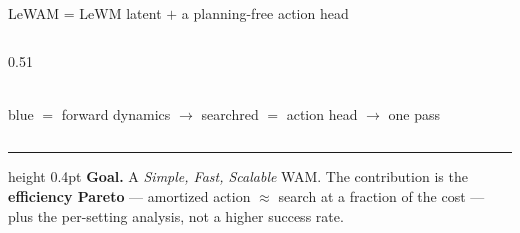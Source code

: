\documentclass[aspectratio=169,10pt]{beamer}
\begin{document}
\begin{frame}{LeWAM = LeWM latent $+$ a planning-free action head}
\begin{columns}[T]
\begin{column}{0.51\textwidth}
\\[3pt]
{\tiny\color{latent}blue $=$ forward dynamics $\to$ search\quad\color{ours}red $=$ action head $\to$ one pass}
\end{column}
\end{columns}
\vspace{3pt}
\hrule height 0.4pt
\vspace{3pt}
{\footnotesize \textbf{Goal.} A \emph{Simple, Fast, Scalable} WAM. The contribution is the \textbf{efficiency Pareto} --- amortized action $\approx$ search at a fraction of the cost --- plus the per-setting analysis, not a higher success rate.}
\end{frame}
\end{document}
